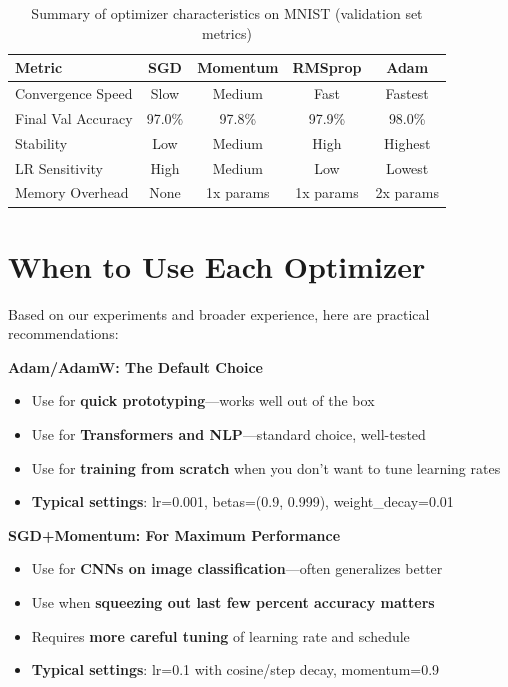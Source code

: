 \documentclass[../../main.tex]{subfiles}
\begin{document}
\begin{table}[htbp]
\centering
\caption{Summary of optimizer characteristics on MNIST (validation set metrics)}
\label{tab:optimizer-summary}
\begin{tabular}{@{}lcccc@{}}
\toprule
\textbf{Metric} & \textbf{SGD} & \textbf{Momentum} & \textbf{RMSprop} & \textbf{Adam} \\
\midrule
Convergence Speed & Slow & Medium & Fast & Fastest \\
Final Val Accuracy & 97.0\% & 97.8\% & 97.9\% & 98.0\% \\
Stability & Low & Medium & High & Highest \\
LR Sensitivity & High & Medium & Low & Lowest \\
Memory Overhead & None & 1x params & 1x params & 2x params \\
\bottomrule
\end{tabular}
\end{table}

\section{When to Use Each Optimizer}
\label{sec:capstone-recommendations}

Based on our experiments and broader experience, here are practical recommendations:

\begin{principle}
\textbf{Adam/AdamW: The Default Choice}
\begin{itemize}
    \item Use for \textbf{quick prototyping}---works well out of the box
    \item Use for \textbf{Transformers and NLP}---standard choice, well-tested
    \item Use for \textbf{training from scratch} when you don't want to tune learning rates
    \item \textbf{Typical settings}: lr=0.001, betas=(0.9, 0.999), weight\_decay=0.01
\end{itemize}
\end{principle}

\begin{principle}
\textbf{SGD+Momentum: For Maximum Performance}
\begin{itemize}
    \item Use for \textbf{CNNs on image classification}---often generalizes better
    \item Use when \textbf{squeezing out last few percent accuracy matters}
    \item Requires \textbf{more careful tuning} of learning rate and schedule
    \item \textbf{Typical settings}: lr=0.1 with cosine/step decay, momentum=0.9
\end{itemize}
\end{principle}
\end{document}
